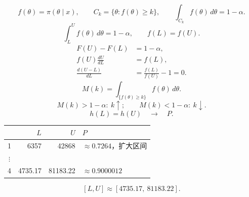 \[
f(\theta)=\pi(\theta\mid x),\qquad
C_k=\{\theta:f(\theta)\geq k\},\qquad
\int_{C_k}f(\theta)\,d\theta=1-\alpha.
\]
\[
\int_L^Uf(\theta)\,d\theta=1-\alpha,\qquad f(L)=f(U).
\]
\begin{align*}
F(U)-F(L)&=1-\alpha,\\
f(U)\frac{dU}{dL}&=f(L),\\
\frac{d(U-L)}{dL}&=\frac{f(L)}{f(U)}-1=0.
\end{align*}
\[
M(k)=\int_{\{f(\theta)\geq k\}}f(\theta)\,d\theta.
\]
\[
M(k)>1-\alpha:\ k\uparrow;\qquad
M(k)<1-\alpha:\ k\downarrow.
\]
\[
h(L)=h(U)\quad\longrightarrow\quad P.
\]
\begin{center}
\begin{tabular}{c rr l}\toprule
 & $L$ & $U$ & $P$\\\midrule
1&6357&42868&$\approx0.7264$，扩大区间\\
$\vdots$&&&\\
4&4735.17&81183.22&$\approx0.9000012$\\\bottomrule
\end{tabular}
\end{center}
\[
[L,U]\approx[4735.17,\ 81183.22].
\]
